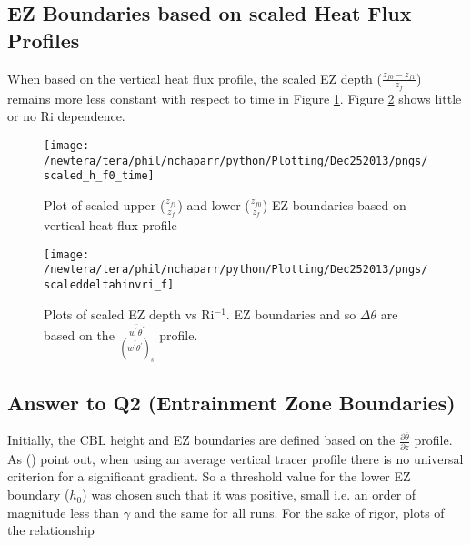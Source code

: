\clearpage

\subsection{\acs{EZ} Boundaries based on scaled Heat Flux Profiles}
\label{susec:fluxbound}
When based on the vertical heat flux profile, the scaled \acs{EZ} depth ($\frac{z_{f0}-z_{f1}}{z_{f}}$) remains more less constant with respect to time in Figure \ref{fig:scaledEZlims1}. Figure \ref{fig:deltahinvri_scaled} shows little or no \acs{Ri} dependence. 

\begin{figure}[htbp]
    \centering
\texttt{[image: /newtera/tera/phil/nchaparr/python/Plotting/Dec252013/pngs/scaled\_h\_f0\_time]}              
\caption[Scaled \acs{EZ} Boundaries based on the vertical heat flux profile]{Plot of scaled upper ($\frac{z_{f1}}{z_{f}}$) and lower ($\frac{z_{f0}}{z_{f}}$) \acs{EZ} boundaries based on vertical heat flux profile}
    \label{fig:scaledEZlims1}   %
\end{figure}

\begin{figure}[htbp]
    \centering
    \texttt{[image: /newtera/tera/phil/nchaparr/python/Plotting/Dec252013/pngs/scaleddeltahinvri\_f]}
    \caption[scaled \acs{EZ} depth vs \acs{Ri}$^{-1}$ based on the vertical heat flux profile]{Plots of scaled \acs{EZ} depth vs \acs{Ri}$^{-1}$. \acs{EZ} boundaries and so $\Delta \theta$ are based on the $\frac{\overline{w^{'}\theta^{'}}}{(\overline{w^{'}\theta^{'}})_{s}}$ profile.}
    \label{fig:deltahinvri_scaled}   %
\end{figure}

\clearpage

\subsection{Answer to Q2 (Entrainment Zone Boundaries)}

Initially, the \acs{CBL} height and \acs{EZ} boundaries are defined based on the $\frac{\partial \overline{\theta}}{\partial z}$ profile.  As \citeauthor{BrooksFowler2} (\citeyear{BrooksFowler2}) point out, when using an average vertical tracer profile there is no universal criterion for a significant gradient.  So a threshold value for the lower \acs{EZ} boundary ($h_{0}$) was chosen such that it was positive, small i.e. an order of magnitude less than $\gamma$ and the same for all runs.  For the sake of rigor, plots of the relationship

